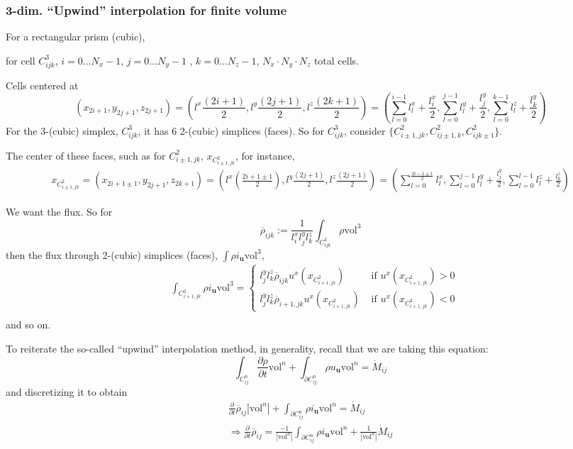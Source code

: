 \documentclass[10pt]{amsart}
\begin{document}
\begin{multicols*}{2}
\subsubsection{3-dim. ``Upwind'' interpolation for finite volume }

For a rectangular prism (cubic),

for cell $C^3_{ijk}$, $i=0 \dots N_x-1$, $j=0 \dots N_y-1$ , $k=0 \dots N_z-1$, $N_x\cdot N_y \cdot N_z$ total cells.

Cells centered at
\[
(x_{2i+1}, y_{2j+1}, z_{2j+1}) = (l^x \frac{ (2i+1)}{2} , l^y \frac{(2j+1)}{2}, l^z \frac{(2k+1)}{2} ) = \left( \sum_{l=0}^{i-1} l_l^x + \frac{l_i^x}{2} , \sum_{l=0}^{j-1}l_l^y + \frac{l_j^y}{2}, \sum_{l=0}^{k-1}l_l^z + \frac{l_k^y}{2}  \right)
\]
For the 3-(cubic) simplex, $C^3_{ijk}$, it has 6 2-(cubic) simplices (faces).  So for $C_{ijk}^3$, consider $\lbrace C^2_{i\pm 1, jk}, C^2_{ij\pm 1,k}, C^2_{ijk\pm 1}\rbrace$.

The center of these faces, such as for $C^2_{i\pm 1, jk}$, $x_{ C^2_{i\pm 1, jk} }$, for instance,
\[
\begin{aligned}
 x_{C^2_{i\pm 1,jk}} = (x_{2i+1\pm 1},y_{2j+1},z_{2k+1}) = (l^x\left( \frac{2i+1\pm 1}{2}\right) , l^y\frac{(2j+1)}{2},  l^z\frac{(2j+1)}{2} ) = \left( \sum_{l=0}^{ \frac{2i - 1 \pm 1 }{2} } l_l^x, \sum_{l=0}^{j-1} l_l^y + \frac{l_j^y}{2}, \sum_{l=0}^{l-1} l_l^z + \frac{l_k^z}{2} \right) 
  \end{aligned}
\]

We want the flux.  So for
\[
\overline{\rho}_{ijk} := \frac{1}{l_i^x l_j^yl^z_k} \int_{C^3_{ijk}} \rho \text{vol}^3
\]
then the flux through 2-(cubic) simplices (faces), $\int \rho i_{\mathbf{u}}\text{vol}^3$,
\[
\begin{aligned}
 &  \int_{C^2_{i+1,jk}} \rho i_{\mathbf{u}} \text{vol}^3 = \begin{cases} l_j^yl_k^z \overline{\rho}_{ijk} u^x(x_{C^2_{i+1, jk} } ) & \text{ if } u^x(x_{C^2_{i+1,jk} }) > 0 \\ 
 l_j^y l^z_k \overline{\rho}_{i+1,jk} u^x(x_{C^2_{i+1, jk} } ) & \text{ if } u^x(x_{C^2_{i+1,jk} }) < 0 \end{cases} \\
\end{aligned}
\]
and so on.  

To reiterate the so-called ``upwind'' interpolation method, in generality, recall that we are taking this equation:
\[
\int_{C^n_{ij}} \frac{ \partial \rho }{ \partial t} \text{vol}^n + \int_{ \partial C^n_{ij} } \rho u_{\mathbf{u}} \text{vol}^n = \dot{M}_{ij}
\]
and discretizing it to obtain
\[
\begin{gathered}
  \frac{ \partial }{ \partial t} \overline{\rho}_{ij} | \text{vol}^n | + \int_{ \partial C_{ij}^n } \rho i_{\mathbf{u}} \text{vol}^n = \dot{M}_{ij } \\ 
\Longrightarrow  \frac{ \partial }{ \partial t} \overline{\rho}_{ij}  = \frac{-1}{ | \text{vol}^n | } \int_{ \partial C_{ij}^n } \rho i_{\mathbf{u}} \text{vol}^n + \frac{1}{ | \text{vol}^n | } \dot{M}_{ij }
  \end{gathered}
\]




\end{multicols*}
\end{document}
